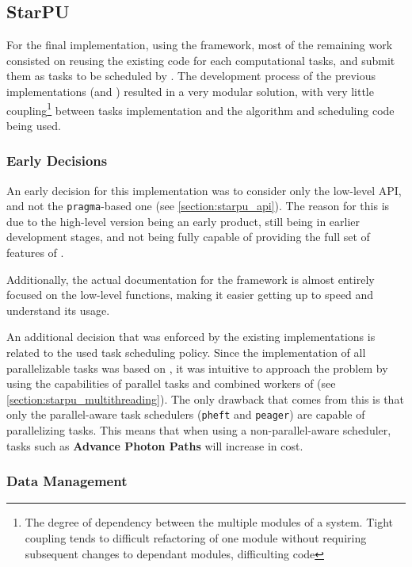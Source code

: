 \documentclass[main.tex]{subfiles}
\begin{document}
\subsection{StarPU} \label{section:impl_starpu}

For the final implementation, using the \starpu framework, most of the remaining work consisted on reusing the existing code for each computational tasks, and submit them as tasks to be scheduled by \starpu. The development process of the previous implementations (\cpu and \cuda) resulted in a very modular solution, with very little coupling\footnote{The degree of dependency between the multiple modules of a system. Tight coupling tends to difficult refactoring of one module without requiring subsequent changes to dependant modules, difficulting code} between tasks implementation and the algorithm and scheduling code being used.

\subsubsection{Early Decisions}

An early decision for this implementation was to consider only the low-level API, and not the \texttt{pragma}-based one (see \cref{section:starpu_api}). The reason for this is due to the high-level version being an early product, still being in earlier development stages, and not being fully capable of providing the full set of features of \starpu.

Additionally, the actual documentation for the framework is almost entirely focused on the low-level functions, making it easier getting up to speed and understand its usage.

An additional decision that was enforced by the existing implementations is related to the used task scheduling policy. Since the \cpu implementation of all parallelizable tasks was based on \openmp, it was intuitive to approach the problem by using the capabilities of parallel tasks and combined workers of \starpu (see \cref{section:starpu_multithreading}). The only drawback that comes from this is that only the parallel-aware task schedulers (\texttt{pheft} and \texttt{peager}) are capable of parallelizing \cpu tasks. This means that when using a non-parallel-aware scheduler, \cpu tasks such as \textbf{Advance Photon Paths} will increase in cost.

\subsubsection{Data Management}
\end{document}
